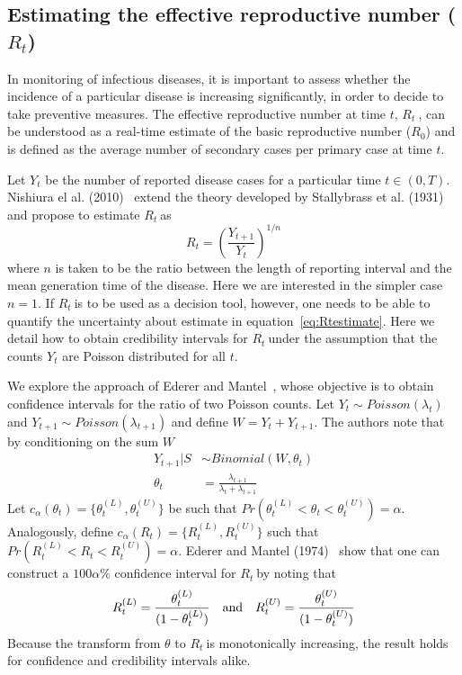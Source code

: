 \documentclass[10pt]{article}
\def \rr {$R_{t}\:$}
\begin{document}
\subsection*{Estimating the effective reproductive number ($R_t$)}

In monitoring of infectious diseases, it is important to assess whether the 
incidence of a  particular disease is increasing significantly, in order to 
decide to take preventive measures.
The effective reproductive number at time $t$, \rr, can be understood as a 
real-time estimate of the basic reproductive number ($R_{0}$) and is defined as 
the average number of secondary cases per primary case at time $t$.

Let $Y_t$ be the number of reported disease cases for a particular time $t \in 
(0, T)$.
Nishiura el al. (2010)~\citep{nishiura} extend the theory developed by 
Stallybrass et al. (1931)~\citep{stallybrass} and propose to estimate \rr as
\begin{equation}
\label{eq:Rtestimate}
R_t = \left( \frac{Y_{t+1}}{Y_t}\right)^{1/n}
\end{equation}
where $n$ is taken to be the ratio between the length of reporting interval and 
the mean generation time of the disease.
Here we are interested in the simpler case $n=1$.
If \rr is to be used as a decision tool, however, one needs to be able to 
quantify the 
uncertainty about estimate in equation~\ref{eq:Rtestimate}. 
Here we detail how to obtain credibility intervals for \rr under the assumption 
that the counts $Y_t$ are Poisson distributed for all $t$.

We explore the approach of Ederer and Mantel~\citep{mantel}, whose objective is 
to obtain 
confidence intervals for the ratio of two Poisson counts. 
Let $Y_{t} \sim Poisson(\lambda_t)$ and $Y_{t+1} \sim Poisson(\lambda_{t+1})$ 
and define $W = Y_{t} + Y_{t+1}$.
The authors note that by conditioning on the sum $W$
\begin{align}
\label{eq:binlike}
Y_{t+1} | S &\sim Binomial(W, \theta_t) \\
\theta_t &= \frac{\lambda_{t+1}}{\lambda_{t} + \lambda_{t+1}}
\end{align}
Let $c_{\alpha}(\theta_t) = \{\theta_t^{(L)} , \theta_t^{(U)} \}$ be such that 
$Pr(\theta_t^{(L)}<\theta_t <\theta_t^{(U)}) = \alpha$.
Analogously, define $c_{\alpha}(R_t) = \{R_t^{(L)} , R_t^{(U)} \}$ such that 
$Pr(R_t^{(L)}<R_t<R_t^{(U)}) = \alpha$.
Ederer and Mantel (1974)~\citep{mantel} show that one can construct a 
$100\alpha 
\%$ confidence interval for \rr by noting that
\begin{equation}
\label{eq:confRt}
 R_t^{(L)} = \frac{\theta_t^{(L)}}{(1-\theta_t^{(L)})} \quad \text{and} \quad 
R_t^{(U)} = \frac{\theta_t^{(U)}}{(1-\theta_t^{(U)})}\\
\end{equation}
Because the transform from $\theta$ to \rr is monotonically 
increasing, the result holds for confidence and credibility intervals alike.
\end{document}
